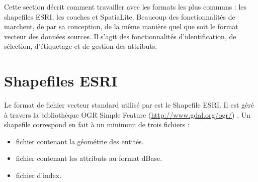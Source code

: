 Cette section décrit comment travailler avec les formats les plus communs : 
les shapefiles ESRI, les couches \pg et SpatiaLite. Beaucoup des fonctionnalités 
de \qg marchent, de par sa conception, de la même manière quel que soit le format 
vecteur des données sources. Il s'agit des fonctionnalités d'identification, de 
sélection, d'étiquetage et de gestion des attributs.

\section{Shapefiles ESRI}

Le format de fichier vecteur standard utilisé par \qg est le Shapefile ESRI. 
Il est géré à travers la bibliothèque OGR Simple Feature  (\url{http://www.gdal.org/ogr/}) 
. Un shapefile correspond en fait à un minimum de trois fichiers : 

\begin{itemize}[label=--]
\item {} fichier contenant la géométrie des entités.
\item {} fichier contenant les attributs au format dBase.
\item {} fichier d'index.
\end{itemize}

